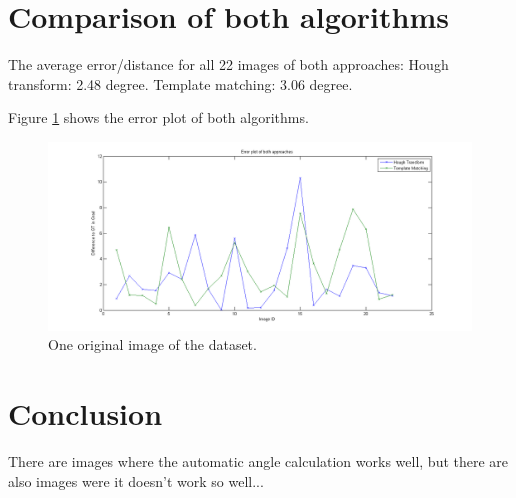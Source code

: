 \documentclass[10pt,twocolumn,letterpaper]{article}
\begin{document}
\section{Comparison of both algorithms}
The average error/distance for all 22 images of both approaches: Hough transform: 2.48 degree. Template matching: 3.06 degree.

Figure \ref{fig:errorPlot} shows the error plot of both algorithms.

\begin{figure}
	\begin{center}		
		\includegraphics[width=1\linewidth]{img/error_plot}
	\end{center}
	\caption{One original image of the dataset.}
	\label{fig:errorPlot}
	
\end{figure}

\section{Conclusion}
There are images where the automatic angle calculation works well, but there are also images were it doesn't work so well...

{\small


}
\end{document}
